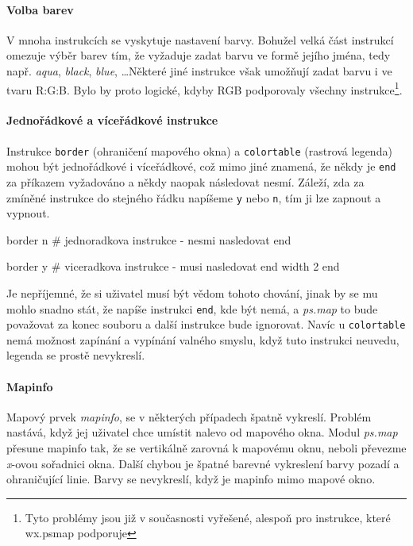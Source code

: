 \documentclass[a4paper,12pt,draft]{article}
\newcommand{\modul}[1]{\emph{#1}}
\newcommand{\instr}[1]{\lstinline[style=psmapInline]|#1|}
\begin{document}
\paragraph*{Volba barev}
\label{sec:psmap:color}
V mnoha instrukcích se vyskytuje nastavení barvy. Bohužel velká část instrukcí omezuje výběr barev tím, že vyžaduje zadat barvu ve formě jejího jména, tedy např. \emph{aqua}, \emph{black}, \emph{blue}, \ldots Některé jiné instrukce však umožňují zadat barvu i ve tvaru R:G:B. Bylo by proto logické, kdyby RGB podporovaly všechny instrukce\footnote{Tyto problémy jsou již v současnosti vyřešené, alespoň pro instrukce, které wx.psmap podporuje}. 

\paragraph*{Jednořádkové a víceřádkové instrukce}
\label{sec:psmap:singleline}
Instrukce \instr{border} (ohraničení mapového okna) a \instr{colortable} (rastrová legenda) mohou být jednořádkové i víceřádkové, což mimo jiné znamená, že někdy je \instr{end} za příkazem vyžadováno a někdy naopak následovat nesmí. Záleží, zda za zmíněné instrukce do stejného řádku napíšeme \instr{y} nebo \instr{n}, tím ji lze zapnout a vypnout. 
\begin{psmap}
border n    # jednoradkova instrukce - nesmi nasledovat end

border y    # viceradkova instrukce - musi nasledovat end
   width 2
end
\end{psmap}
Je nepříjemné, že si uživatel musí být vědom tohoto chování, jinak by se mu mohlo snadno stát, že napíše instrukci \instr{end}, kde být nemá, a \modul{ps.map} to bude považovat za konec souboru a další instrukce bude ignorovat.
Navíc u \instr{colortable} nemá možnost zapínání a vypínání valného smyslu, když tuto instrukci neuvedu, legenda se prostě nevykreslí.

\paragraph*{Mapinfo}
\label{sec:psmap:mapinfo}
Mapový prvek \emph{mapinfo}, se v některých případech špatně vykreslí. Problém nastává, když jej uživatel chce umístit nalevo od mapového okna. Modul \modul{ps.map} přesune mapinfo tak, že se vertikálně zarovná k mapovému oknu, neboli převezme \emph{x}-ovou sořadnici okna. Další chybou je špatné barevné vykreslení barvy pozadí a ohraničující linie. Barvy se nevykreslí, když je mapinfo  mimo mapové okno. 
\end{document}
